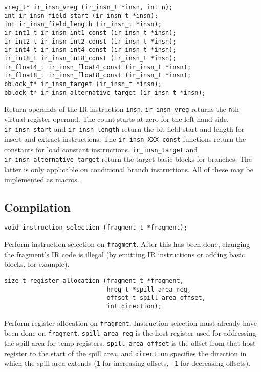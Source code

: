 \documentclass{article}
\newcommand{\cc}[1]{\texttt{#1}} %
\begin{document}
\begin{verbatim}
vreg_t* ir_insn_vreg (ir_insn_t *insn, int n);
int ir_insn_field_start (ir_insn_t *insn);
int ir_insn_field_length (ir_insn_t *insn);
ir_int1_t ir_insn_int1_const (ir_insn_t *insn);
ir_int2_t ir_insn_int2_const (ir_insn_t *insn);
ir_int4_t ir_insn_int4_const (ir_insn_t *insn);
ir_int8_t ir_insn_int8_const (ir_insn_t *insn);
ir_float4_t ir_insn_float4_const (ir_insn_t *insn);
ir_float8_t ir_insn_float8_const (ir_insn_t *insn);
bblock_t* ir_insn_target (ir_insn_t *insn);
bblock_t* ir_insn_alternative_target (ir_insn_t *insn);
\end{verbatim}

Return operands of the IR instruction \cc{insn}.  \cc{ir\_insn\_vreg}
returns the \cc{n}th virtual register operand.  The count starts at
zero for the left hand side.  \cc{ir\_insn\_start} and
\cc{ir\_insn\_length} return the bit field start and length for
insert and extract instructions.  The \cc{ir\_insn\_XXX\_const}
functions return the constants for load constant instructions.
\cc{ir\_insn\_target} and \cc{ir\_insn\_alternative\_target} return
the target basic blocks for branches.  The latter is only applicable
on conditional branch instructions.  All of these may be implemented
as macros.

\subsection{Compilation}

\begin{verbatim}
void instruction_selection (fragment_t *fragment);
\end{verbatim}

Perform instruction selection on \cc{fragment}.  After this has been
done, changing the fragment's IR code is illegal (by emitting IR
instructions or adding basic blocks, for example).

\begin{verbatim}
size_t register_allocation (fragment_t *fragment,
                            hreg_t *spill_area_reg,
                            offset_t spill_area_offset,
                            int direction);
\end{verbatim}

Perform register allocation on \cc{fragment}.  Instruction selection
must already have been done on \cc{fragment}.  \cc{spill\_area\_reg}
is the host register used for addressing the spill area for temp
registers.  \cc{spill\_area\_offset} is the offset from that host
register to the start of the spill area, and \cc{direction} specifies
the direction in which the spill area extends (\cc{1} for increasing
offsets, \cc{-1} for decreasing offsets).
\end{document}
